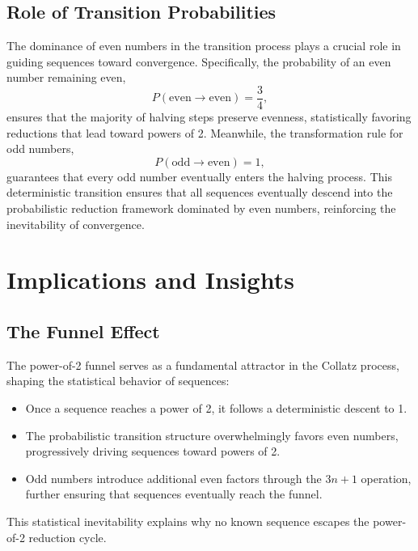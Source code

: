 \subsection{Role of Transition Probabilities}
The dominance of even numbers in the transition process plays a crucial role in guiding sequences toward convergence. Specifically, the probability of an even number remaining even,
\[
P(\text{even} \to \text{even}) = \frac{3}{4},
\]
ensures that the majority of halving steps preserve evenness, statistically favoring reductions that lead toward powers of 2. Meanwhile, the transformation rule for odd numbers,
\[
P(\text{odd} \to \text{even}) = 1,
\]
guarantees that every odd number eventually enters the halving process. This deterministic transition ensures that all sequences eventually descend into the probabilistic reduction framework dominated by even numbers, reinforcing the inevitability of convergence.

\section{Implications and Insights}
\subsection{The Funnel Effect}
The power-of-2 funnel serves as a fundamental attractor in the Collatz process, shaping the statistical behavior of sequences:
\begin{itemize}
    \item Once a sequence reaches a power of 2, it follows a deterministic descent to 1.
    \item The probabilistic transition structure overwhelmingly favors even numbers, progressively driving sequences toward powers of 2.
    \item Odd numbers introduce additional even factors through the \( 3n+1 \) operation, further ensuring that sequences eventually reach the funnel.
\end{itemize}
This statistical inevitability explains why no known sequence escapes the power-of-2 reduction cycle.

